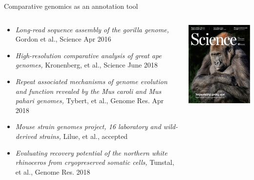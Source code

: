 \documentclass[10pt,
               hyperref={bookmarks=false,
                         bookmarksopen=false,
                         colorlinks=true,
                         linkcolor=blue,
                         urlcolor=blue},
               xcolor={svgnames,table}]{beamer}
\newenvironment{tightitemize}{%
\begin{itemize}
  \setlength{\itemsep}{1pt}%
  \setlength{\parskip}{0pt}%
  \setlength{\parsep}{0pt}%
}{\end{itemize}}
\newcommand\paperref[4]{%
  {\it #1, }{ #2,}{ #3}
}
\begin{document}
\begin{frame}{Comparative genomics as an annotation tool}
  \begin{columns}
    \begin{column}{0.80\textwidth}
      \begin{tightitemize}
      \item \paperref{Long-read sequence assembly of the gorilla genome}
        {Gordon et al.}{Science Apr 2016}{10.1126/science.aae0344}
      \item \paperref{High-resolution comparative analysis of great ape genomes}
        {Kronenberg, et al.}{Science June 2018}{10.1126/science.aar6343}
      \item \paperref{Repeat associated mechanisms of genome evolution and function revealed by the Mus caroli and Mus pahari genomes}
        {Tybert, et al.}{Genome Res. Apr 2018}{10.1101/gr.234096.117}
      \item \paperref{Mouse strain genomes project, 16 laboratory and wild-derived strains}
        {Lilue, et al.}{accepted}{}
      \item \paperref{Evaluating recovery potential of the northern white rhinoceros from cryopreserved somatic cells}
        {Tunstal, et al.}{Genome Res. 2018}{10.1101/gr.227603.117}
      \end{tightitemize}
    \end{column}
    \begin{column}{0.20\textwidth}
      \includegraphics[scale=0.2]{images/science-gorilla.jpg}

\end{column}
\end{columns}
\end{frame}
\end{document}
